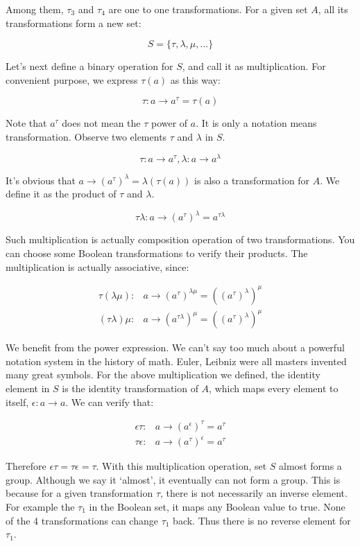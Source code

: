 \documentclass[b5paper]{article}
\begin{document}
Among them, $\tau_3$ and $\tau_4$ are one to one transformations. For a given set $A$, all its transformations form a new set:

\[
S = \{\tau, \lambda, \mu, ...\}
\]

Let's next define a binary operation for $S$, and call it as multiplication. For convenient purpose, we express $\tau(a)$ as this way:

\[
\tau: a \to a^\tau = \tau(a)
\]

Note that $a^\tau$ does not mean the $\tau$ power of $a$. It is only a notation means transformation. Observe two elements $\tau$ and $\lambda$ in $S$.

\[
\tau: a \to a^\tau,  \lambda: a \to a^\lambda
\]

It's obvious that $a \to (a^\tau)^\lambda = \lambda(\tau(a))$ is also a transformation for $A$. We define it as the product of $\tau$ and $\lambda$.

\[
\tau\lambda: a \to (a^\tau)^\lambda = a^{\tau\lambda}
\]

Such multiplication is actually composition operation of two transformations. You can choose some Boolean transformations to verify their products. The multiplication is actually associative, since:

\[
\begin{array}{rl}
\tau(\lambda\mu): & a \to (a^\tau)^{\lambda\mu} = ((a^\tau)^\lambda)^\mu \\
(\tau\lambda)\mu: & a \to (a^{\tau\lambda})^\mu = ((a^\tau)^\lambda)^\mu
\end{array}
\]

We benefit from the power expression. We can't say too much about a powerful notation system in the history of math. Euler, Leibniz were all masters invented many great symbols. For the above multiplication we defined, the identity element in $S$ is the identity transformation of $A$, which maps every element to itself, $\epsilon: a \to a$. We can verify that:

\[
\begin{array}{rl}
\epsilon\tau: & a \to (a^\epsilon)^\tau = a^\tau \\
\tau\epsilon: & a \to (a^\tau)^\epsilon = a^\tau
\end{array}
\]

Therefore $\epsilon\tau = \tau\epsilon = \tau$. With this multiplication operation, set $S$ almost forms a group. Although we say it `almost', it eventually can not form a group. This is because for a given transformation $\tau$, there is not necessarily an inverse element. For example the $\tau_1$ in the Boolean set, it maps any Boolean value to true. None of the 4 transformations can change $\tau_1$ back. Thus there is no reverse element for $\tau_1$.
\end{document}
